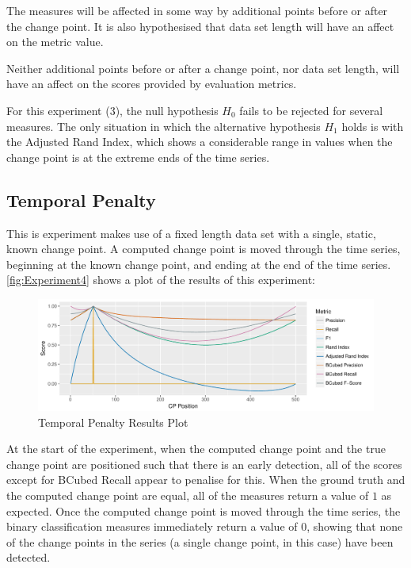 \documentclass[../main.tex]{subfiles}
\begin{document}
\pagebreak[3]

\begin{hypothesis*}
    The measures will be affected in some way by additional points before or after the change point. It is also hypothesised that data set length will have an affect on the metric value.
\end{hypothesis*}

\begin{nullhypothesis*}
    Neither additional points before or after a change point, nor data set length, will have an affect on the scores provided by evaluation metrics.
\end{nullhypothesis*}

For this experiment (3), the null hypothesis $H_0$ fails to be rejected for several measures. The only situation in which the alternative hypothesis $H_1$ holds is with the Adjusted Rand Index, which shows a considerable range in values when the change point is at the extreme ends of the time series.

\subsection{Temporal Penalty}

This is experiment makes use of a fixed length data set with a single, static, known change point. A computed change point is moved through the time series, beginning at the known change point, and ending at the end of the time series. \autoref{fig:Experiment4} shows a plot of the results of this experiment:

\begin{figure}[h]
    \includegraphics[width=\textwidth]{figures/Experiment3}
    \caption{Temporal Penalty Results Plot}
    \label{fig:Experiment4}
\end{figure}

At the start of the experiment, when the computed change point and the true change point are positioned such that there is an early detection, all of the scores except for BCubed Recall appear to penalise for this. When the ground truth and the computed change point are equal, all of the measures return a value of $1$ as expected. Once the computed change point is moved through the time series, the binary classification measures immediately return a value of $0$, showing that none of the change points in the series (a single change point, in this case) have been detected.
\end{document}
